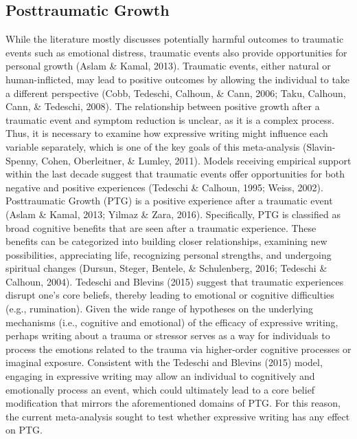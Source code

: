 \documentclass[,man]{apa6}
\begin{document}
\hypertarget{posttraumatic-growth}{%
\subsection{Posttraumatic Growth}\label{posttraumatic-growth}}

While the literature mostly discusses potentially harmful outcomes to traumatic events such as emotional distress, traumatic events also provide opportunities for personal growth (Aslam \& Kamal, 2013). Traumatic events, either natural or human-inflicted, may lead to positive outcomes by allowing the individual to take a different perspective (Cobb, Tedeschi, Calhoun, \& Cann, 2006; Taku, Calhoun, Cann, \& Tedeschi, 2008). The relationship between positive growth after a traumatic event and symptom reduction is unclear, as it is a complex process. Thus, it is necessary to examine how expressive writing might influence each variable separately, which is one of the key goals of this meta-analysis (Slavin-Spenny, Cohen, Oberleitner, \& Lumley, 2011). Models receiving empirical support within the last decade suggest that traumatic events offer opportunities for both negative and positive experiences (Tedeschi \& Calhoun, 1995; Weiss, 2002). Posttraumatic Growth (PTG) is a positive experience after a traumatic event (Aslam \& Kamal, 2013; Yilmaz \& Zara, 2016). Specifically, PTG is classified as broad cognitive benefits that are seen after a traumatic experience. These benefits can be categorized into building closer relationships, examining new possibilities, appreciating life, recognizing personal strengths, and undergoing spiritual changes (Dursun, Steger, Bentele, \& Schulenberg, 2016; Tedeschi \& Calhoun, 2004). Tedeschi and Blevins (2015) suggest that traumatic experiences disrupt one's core beliefs, thereby leading to emotional or cognitive difficulties (e.g., rumination). Given the wide range of hypotheses on the underlying mechanisms (i.e., cognitive and emotional) of the efficacy of expressive writing, perhaps writing about a trauma or stressor serves as a way for individuals to process the emotions related to the trauma via higher-order cognitive processes or imaginal exposure. Consistent with the Tedeschi and Blevins (2015) model, engaging in expressive writing may allow an individual to cognitively and emotionally process an event, which could ultimately lead to a core belief modification that mirrors the aforementioned domains of PTG. For this reason, the current meta-analysis sought to test whether expressive writing has any effect on PTG.
\end{document}
